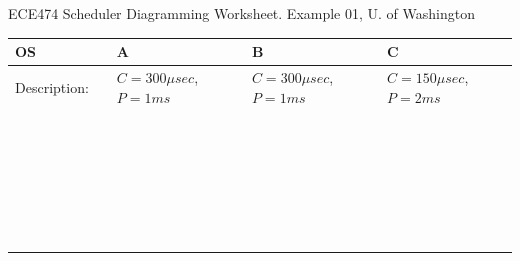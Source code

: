 \documentclass{article}
\begin{document}
ECE474 Scheduler Diagramming Worksheet.  Example 01,  U. of Washington\\
\renewcommand\arraystretch{1.7}%
\begin{tabular}{|p{1in}|p{0.2in}|p{1.2in}|p{1.2in}|p{1.2in}|}
\hline
OS      &  & A & B & C \\ \hline
Description:   &  & $C=300\mu sec$, $P=1ms$   & $C=300\mu sec$, $P=1ms$  & $C=150\mu sec$,$P=2ms$ \\ \hline
        &  &   &   &   \\ \hline
        &  &   &   &   \\ \hline
        &  &   &   &   \\ \hline
        &  &   &   &   \\ \hline
        &  &   &   &   \\ \hline
        &  &   &   &   \\ \hline
        &  &   &   &   \\ \hline
        &  &   &   &   \\ \hline
        &  &   &   &   \\ \hline
        &  &   &   &   \\ \hline
        &  &   &   &   \\ \hline
        &  &   &   &   \\ \hline
        &  &   &   &   \\ \hline
        &  &   &   &   \\ \hline
        &  &   &   &   \\ \hline
        &  &   &   &   \\ \hline
        &  &   &   &   \\ \hline
        &  &   &   &   \\ \hline
        &  &   &   &   \\ \hline
        &  &   &   &   \\ \hline
        &  &   &   &   \\ \hline
        &  &   &   &   \\ \hline
        &  &   &   &   \\ \hline
        &  &   &   &   \\ \hline
        &  &   &   &   \\ \hline
        &  &   &   &   \\ \hline
        &  &   &   &   \\ \hline

\end{tabular}
\newpage
\end{document}
